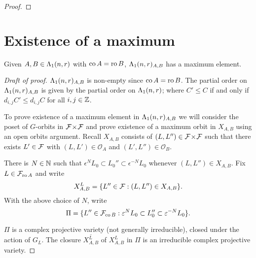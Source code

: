 \documentclass[a4paper, 11pt]{report}
\begin{document}
\begin{proof}
\finishproof
\end{proof}

\section{Existence of a maximum}

\begin{proposition}\label{proposition:existence-maximum}
Given $A,B\in\Lambda_1(n,r)$ with $\operatorname{co}{A}=\operatorname{ro}{B}$, $\Lambda_1(n,r)_{A,B}$ has a maximum element.
\end{proposition}

\begin{proof}[Draft of proof]
$\Lambda_1(n,r)_{A,B}$ is non-empty since $\operatorname{co}{A}=\operatorname{ro}{B}$. The partial order on $\Lambda_1(n,r)_{A,B}$ is given by the partial order on $\Lambda_1(n,r)$; where $C'\le C$ if and only if $d_{i,j}C'\le d_{i,j}C$ for all $i,j\in\mathbb{Z}$.

To prove existence of a maximum element in $\Lambda_1(n,r)_{A,B}$ we will consider the poset of $G$-orbits in ${\mathcal{F}\!\times\!\mathcal{F}}$ and prove existence of a maximum orbit in $X_{A,B}$ using an open orbits argument. Recall $X_{A,B}$ consists of $(L,L'')\in{\mathcal{F}\!\times\!\mathcal{F}}$ such that there exists $L'\in\mathcal{F}$ with $(L,L')\in\mathcal{O}_A$ and $(L',L'')\in\mathcal{O}_B$.

There is $N\in\mathbb{N}$ such that $\epsilon^N L_0\subset L_0''\subset \epsilon^{-N}L_0$ whenever $(L,L'')\in X_{A,B}$. Fix $L\in\mathcal{F}_{\operatorname{ro}{A}}$ and write
\begin{equation*}
X_{A,B}^L = \{L''\in\mathcal{F}: (L,L'')\in X_{A,B}\}.
\end{equation*}
With the above choice of $N$, write
\begin{equation*}
\Pi = \{L''\in\mathcal{F}_{\operatorname{co}{B}}: \varepsilon^N L_0\subset L_0''\subset \varepsilon^{-N} L_0\}.
\end{equation*}

$\Pi$ is a complex projective variety (not generally irreducible), closed under the action of $G_L$. \needsreference The closure $\overline{X_{A,B}^L}$ of $X_{A,B}^L$ in $\Pi$ is an irreducible complex projective variety.


\end{proof}
\end{document}
